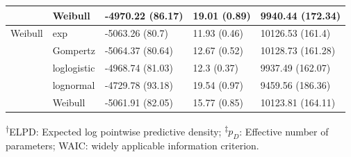 \documentclass[AMA,STIX1COL]{WileyNJD-v2}
\begin{document}
\begin{table}[!ht]
\begin{tabular}{l|l|l|l|l}
\hline
 & Weibull & -4970.22 (86.17) & 19.01 (0.89) & 9940.44 (172.34)\\
\hline
Weibull & exp & -5063.26 (80.7) & 11.93 (0.46) & 10126.53 (161.4)\\
\hline
 & Gompertz & -5064.37 (80.64) & 12.67 (0.52) & 10128.73 (161.28)\\
\hline
 & loglogistic & -4968.74 (81.03) & 12.3 (0.37) & 9937.49 (162.07)\\
\hline
 & lognormal & -4729.78 (93.18) & 19.54 (0.97) & 9459.56 (186.36)\\
\hline
 & Weibull & -5061.91 (82.05) & 15.77 (0.85) & 10123.81 (164.11)\\
\hline
\end{tabular}
\begin{tablenotes}%
\textsuperscript{$\dagger$}ELPD: Expected log pointwise predictive density;
\textsuperscript{$\ddagger$}$p_D$: Effective number of parameters;
WAIC: widely applicable information criterion.
\end{tablenotes}
\end{table}
\end{document}
